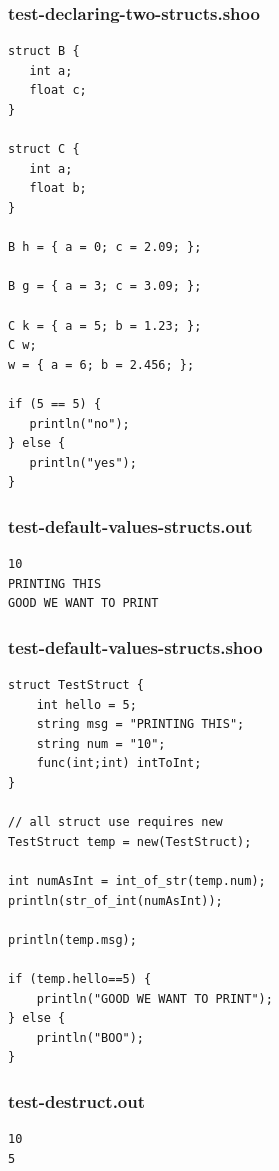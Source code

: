 \documentclass[12pt]{article}
\begin{document}
\subsubsection{test-declaring-two-structs.shoo}
\begin{mdframed}[hidealllines=true,backgroundcolor=blue!10]
\begin{lstlisting}
struct B {
   int a;
   float c;
}

struct C {
   int a;
   float b;
}

B h = { a = 0; c = 2.09; };

B g = { a = 3; c = 3.09; };

C k = { a = 5; b = 1.23; };
C w;
w = { a = 6; b = 2.456; };

if (5 == 5) {
   println("no");
} else {
   println("yes");
}\end{lstlisting}
\end{mdframed}
\subsubsection{test-default-values-structs.out}
\begin{mdframed}[hidealllines=true,backgroundcolor=green!10]
\begin{lstlisting}
10
PRINTING THIS
GOOD WE WANT TO PRINT
\end{lstlisting}
\end{mdframed}
\subsubsection{test-default-values-structs.shoo}
\begin{mdframed}[hidealllines=true,backgroundcolor=blue!10]
\begin{lstlisting}
struct TestStruct {
	int hello = 5;
	string msg = "PRINTING THIS";
	string num = "10";
	func(int;int) intToInt;
}

// all struct use requires new
TestStruct temp = new(TestStruct);

int numAsInt = int_of_str(temp.num);
println(str_of_int(numAsInt));

println(temp.msg);

if (temp.hello==5) {
	println("GOOD WE WANT TO PRINT");
} else {
	println("BOO");
}\end{lstlisting}
\end{mdframed}
\subsubsection{test-destruct.out}
\begin{mdframed}[hidealllines=true,backgroundcolor=green!10]
\begin{lstlisting}
10
5
\end{lstlisting}
\end{mdframed}
\end{document}
